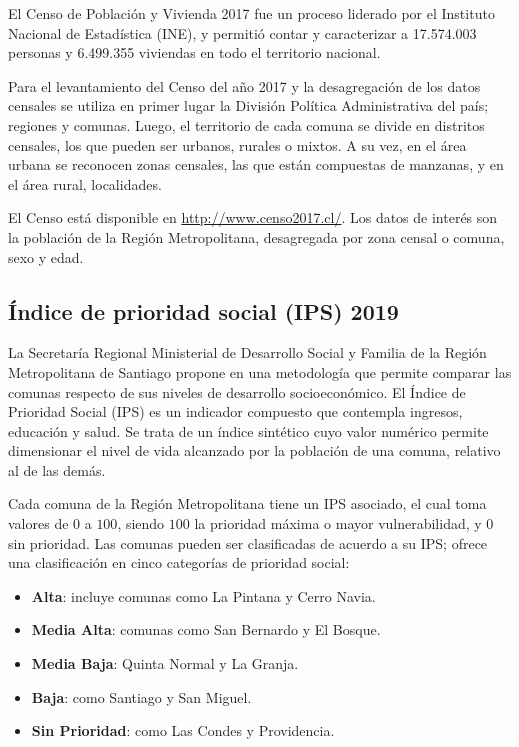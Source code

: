 El Censo de Población y Vivienda 2017 fue un proceso liderado por el Instituto Nacional de Estadística (INE), y permitió contar y caracterizar a 17.574.003 personas y 6.499.355 viviendas en todo el territorio nacional.

Para el levantamiento del Censo del año 2017 y la desagregación de los datos censales se utiliza en primer lugar la División Política Administrativa del país; regiones y comunas. Luego, el territorio de cada comuna se divide en distritos censales, los que pueden ser urbanos, rurales o mixtos. A su vez, en el área urbana se reconocen zonas censales, las que están compuestas de manzanas, y en el área rural, localidades.

El Censo está disponible en \url{http://www.censo2017.cl/}. Los datos de interés son la población de la Región Metropolitana, desagregada por zona censal o comuna, sexo y edad.


\subsection{\'Indice de prioridad social (IPS) 2019}\label{sec:ips}


La Secretaría Regional Ministerial de Desarrollo Social y Familia de la Región Metropolitana de Santiago propone en \cite{SEREMIRM2019} una metodología que permite comparar las comunas respecto de sus niveles de desarrollo socioeconómico. El Índice de Prioridad Social (IPS) es un indicador compuesto que contempla ingresos, educación y salud. Se trata de un índice sintético cuyo valor numérico permite dimensionar el nivel de vida alcanzado por la población de una comuna, relativo al de las demás. 

Cada comuna de la Región Metropolitana tiene un IPS asociado, el cual toma valores de \(0\) a \(100\), siendo \(100\) la prioridad máxima o mayor vulnerabilidad, y \(0\) sin prioridad. Las comunas pueden ser clasificadas de acuerdo a su IPS; \cite{SEREMIRM2019} ofrece una clasificación en cinco categorías de prioridad social:

\begin{itemize}
\item \textbf{Alta}: incluye comunas como La Pintana y Cerro Navia.
\item \textbf{Media Alta}: comunas como San Bernardo y El Bosque.
\item \textbf{Media Baja}: Quinta Normal y La Granja.
\item \textbf{Baja}: como Santiago y San Miguel.
\item \textbf{Sin Prioridad}: como Las Condes y Providencia.
\end{itemize}


